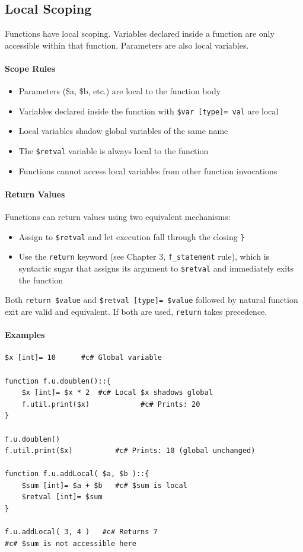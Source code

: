 \subsection{Local Scoping}
\label{sec:function-scope}
Functions have local scoping. Variables declared inside a function are only accessible within that function. Parameters are also local variables.

\paragraph{Scope Rules}
\begin{itemize}
\item Parameters (\$a, \$b, etc.) are local to the function body
\item Variables declared inside the function with \texttt{\$var [type]= val} are local
\item Local variables shadow global variables of the same name
\item The \texttt{\$retval} variable is always local to the function
\item Functions cannot access local variables from other function invocations
\end{itemize}

\paragraph{Return Values}
Functions can return values using two equivalent mechanisms:
\begin{itemize}
\item Assign to \texttt{\$retval} and let execution fall through the closing \texttt{\}}
\item Use the \texttt{return} keyword (see Chapter 3, \texttt{f\_statement} rule), which is syntactic sugar that assigns its argument to \texttt{\$retval} and immediately exits the function
\end{itemize}
Both \texttt{return \$value} and \texttt{\$retval [type]= \$value} followed by natural function exit are valid and equivalent. If both are used, \texttt{return} takes precedence.

\paragraph{Examples}
\begin{verbatim}
$x [int]= 10      #c# Global variable

function f.u.doublen()::{
    $x [int]= $x * 2  #c# Local $x shadows global
    f.util.print($x)            #c# Prints: 20
}

f.u.doublen()
f.util.print($x)          #c# Prints: 10 (global unchanged)

function f.u.addLocal( $a, $b )::{
    $sum [int]= $a + $b   #c# $sum is local
    $retval [int]= $sum
}

f.u.addLocal( 3, 4 )   #c# Returns 7
#c# $sum is not accessible here
\end{verbatim}

